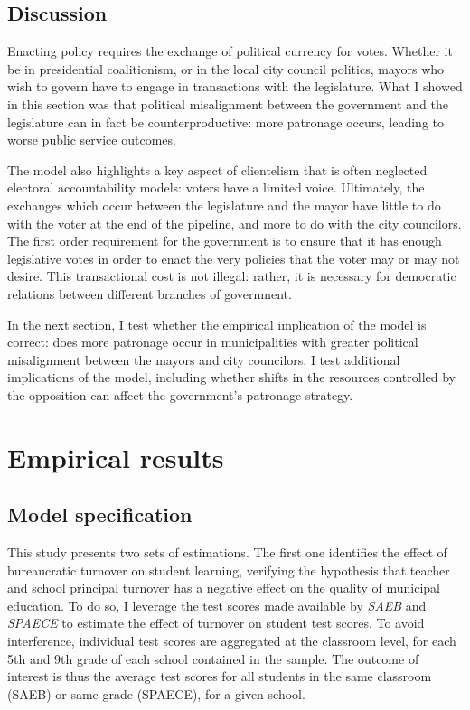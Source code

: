 \subsection*{Discussion}

Enacting policy requires the exchange of political currency for votes. Whether it be in presidential coalitionism, or in the local city council politics, mayors who wish to govern have to engage in transactions with the legislature. What I showed in this section was that political misalignment between the government and the legislature can in fact be counterproductive: more patronage occurs, leading to worse public service outcomes.

The model also highlights a key aspect of clientelism that is often neglected electoral accountability models: voters have a limited voice. Ultimately, the exchanges which occur between the legislature and the mayor have little to do with the voter at the end of the pipeline, and more to do with the city councilors. The first order requirement for the government is to ensure that it has enough legislative votes in order to enact the very policies that the voter may or may not desire. This transactional cost is not illegal: rather, it is necessary for democratic relations between different branches of government.

In the next section, I test whether the empirical implication of the model is correct: does more patronage occur in municipalities with greater political misalignment between the mayors and city councilors. I test additional implications of the model, including whether shifts in the resources controlled by the opposition can affect the government's patronage strategy.

\section{Empirical results}
\label{sec:empirics}

\subsection*{Model specification}

This study presents two sets of estimations. The first one identifies the effect of bureaucratic turnover on student learning, verifying the hypothesis that teacher and school principal turnover has a negative effect on the quality of municipal education. To do so, I leverage the test scores made available by \emph{SAEB} and \emph{SPAECE} to estimate the effect of turnover on student test scores. To avoid interference, individual test scores are aggregated at the classroom level, for each 5th and 9th grade of each school contained in the sample. The outcome of interest is thus the average test scores for all students in the same classroom (SAEB) or same grade (SPAECE), for a given school.

